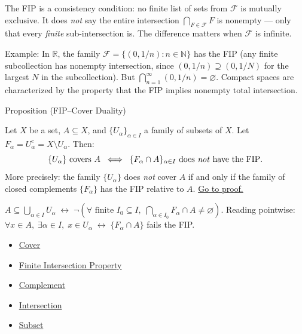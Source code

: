\begin{remark*}
The FIP is a consistency condition: no finite list of sets from $\mathcal{F}$
is mutually exclusive. It does \emph{not} say the entire intersection
$\bigcap_{F \in \mathcal{F}} F$ is nonempty --- only that every \emph{finite}
sub-intersection is. The difference matters when $\mathcal{F}$ is infinite.

Example: In $\mathbb{R}$, the family $\mathcal{F} = \{(0, 1/n) : n \in
\mathbb{N}\}$ has the FIP (any finite subcollection has nonempty intersection,
since $(0, 1/n) \supseteq (0, 1/N)$ for the largest $N$ in the subcollection).
But $\bigcap_{n=1}^\infty (0,1/n) = \varnothing$. Compact spaces are
characterized by the property that the FIP implies nonempty total
intersection.
\end{remark*}


\begin{propositionbox}{Proposition (FIP--Cover Duality)}
\begin{proposition}\label{prop:fip-duality}
Let $X$ be a set, $A \subseteq X$, and $\{U_\alpha\}_{\alpha \in I}$ a
family of subsets of $X$. Let $F_\alpha = U_\alpha^c = X \setminus U_\alpha$.
Then:
\[
\{U_\alpha\} \text{ covers } A
\;\;\Longleftrightarrow\;\;
\{F_\alpha \cap A\}_{\alpha \in I} \text{ does \emph{not} have the FIP}.
\]
More precisely: the family $\{U_\alpha\}$ does \emph{not} cover $A$ if and
only if the family of closed complements $\{F_\alpha\}$ has the FIP relative
to $A$.
\hyperref[prf:fip-duality]{Go to proof.}
\end{proposition}
\end{propositionbox}

\begin{remark*}
$A \subseteq \bigcup_{\alpha \in I} U_\alpha \;\leftrightarrow\; \neg(\forall\text{ finite }I_0\subseteq I,\; \bigcap_{\alpha\in I_0} F_\alpha \cap A \neq \varnothing)$. Reading pointwise: $\forall x\in A,\;\exists\alpha\in I,\; x\in U_\alpha \;\leftrightarrow\; \{F_\alpha\cap A\}$ fails the FIP.
\end{remark*}


\begin{dependencies}
\begin{itemize}
  \item \hyperref[def:cover-full]{Cover}
  \item \hyperref[def:fip]{Finite Intersection Property}
  \item \hyperref[def:complement]{Complement}
  \item \hyperref[def:intersection]{Intersection}
  \item \hyperref[def:subset]{Subset}
\end{itemize}
\end{dependencies}

